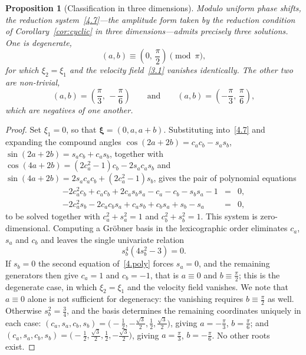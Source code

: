 \documentclass[11pt]{jfm}
\newtheorem{proposition}[lemma]{Proposition}
\numberwithin{equation}{section}
\begin{document}
\begin{proposition}[Classification in three dimensions]
\label{prop:3Dclassification}
Modulo uniform phase shifts, the reduction system~\eqref{4.7}---the amplitude form taken by the
reduction condition of Corollary~\ref{cor:cyclic} in three dimensions---admits precisely three
solutions.
One is degenerate,
\[
(a,b)\equiv\left(0,\,\frac{\pi}{2}\right) \pmod\pi ,
\]
for which $\xi_2=\xi_1$ and the velocity field~\eqref{3.1} vanishes identically. The other two are
non-trivial,
\[
(a,b)=\left(\frac{\pi}{3},\,-\frac{\pi}{6}\right)
\qquad\text{and}\qquad
(a,b)=\left(-\frac{\pi}{3},\,\frac{\pi}{6}\right),
\]
which are negatives of one another.
\end{proposition}

\begin{proof}
Set $\xi_1=0$, so that $\boldsymbol{\xi}=(0,a,a+b)$. Substituting into~\eqref{4.7} and expanding the
compound angles $\cos(2a+2b)=c_ac_b-s_as_b$, $\sin(2a+2b)=s_ac_b+c_as_b$, together with
$\cos(4a+2b)=(2c_a^2-1)c_b-2s_ac_as_b$ and $\sin(4a+2b)=2s_ac_ac_b+(2c_a^2-1)s_b$, gives the pair
of polynomial equations
\begin{eqnarray}
\label{4.poly}
-2c_a^2c_b+c_ac_b+2c_as_bs_a-c_a-c_b-s_bs_a-1&=&0,\nonumber\\
-2c_a^2s_b-2c_ac_bs_a+c_as_b+c_bs_a+s_b-s_a&=&0,
\end{eqnarray}
to be solved together with $c_a^2+s_a^2=1$ and $c_b^2+s_b^2=1$. This system is zero-dimensional.
Computing a Gr\"obner basis in the lexicographic order eliminates $c_a$, $s_a$ and $c_b$ and leaves
the single univariate relation
\begin{equation}
\label{4.elim}
s_b^4\left(4s_b^2-3\right)=0 .
\end{equation}
If $s_b=0$ the second equation of~\eqref{4.poly} forces $s_a=0$, and the remaining generators then
give $c_a=1$ and $c_b=-1$, that is $a\equiv0$ and $b\equiv\tfrac{\pi}{2}$; this is the degenerate
case, in which $\xi_2=\xi_1$ and the velocity field vanishes. We note that $a\equiv0$ alone is not
sufficient for degeneracy: the vanishing requires $b\equiv\tfrac{\pi}{2}$ as well. Otherwise
$s_b^2=\tfrac{3}{4}$, and the basis determines the remaining coordinates uniquely in each case:
$(c_a,s_a,c_b,s_b)=\bigl(-\tfrac12,-\tfrac{\sqrt3}{2},\tfrac12,\tfrac{\sqrt3}{2}\bigr)$, giving
$a=-\tfrac{\pi}{3}$, $b=\tfrac{\pi}{6}$; and
$(c_a,s_a,c_b,s_b)=\bigl(-\tfrac12,\tfrac{\sqrt3}{2},\tfrac12,-\tfrac{\sqrt3}{2}\bigr)$, giving
$a=\tfrac{\pi}{3}$, $b=-\tfrac{\pi}{6}$. No other roots exist.
\end{proof}
\end{document}
